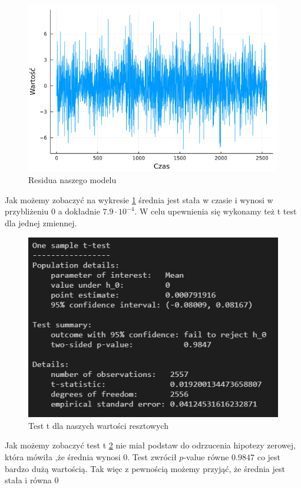 \documentclass[12pt]{article}
\theoremstyle{exer}
\begin{document}
	\begin{figure}[H]
	\centering
	\includegraphics[width=3\columnwidth/4]{img/residua.png}
	\caption{Residua naszego modelu}
	\label{fig:residua}
\end{figure}
 Jak możemy zobaczyć na wykresie \ref{fig:residua} średnia jest stała w czasie i wynosi w przybliżeniu $0$  a dokładnie $ 7.9 \cdot 10^{-4}$. 
 W celu upewnienia się wykonamy też t test dla jednej zmiennej.
 	\begin{figure}[H]
 	\centering
 	\includegraphics[width=3\columnwidth/4]{img/t_test.png}
 	\caption{Test t dla naszych wartości resztowych}
 	\label{t_test}
 \end{figure}
Jak możemy zobaczyć test t \ref{t_test} nie miał podstaw do odrzucenia hipotezy zerowej, która mówiła ,że średnia wynosi $0$. Test zwrócił $p$-value równe $0.9847$ co jest bardzo dużą wartością.
Tak więc z pewnością możemy przyjąć, że średnia jest stała i równa $0$
\end{document}
